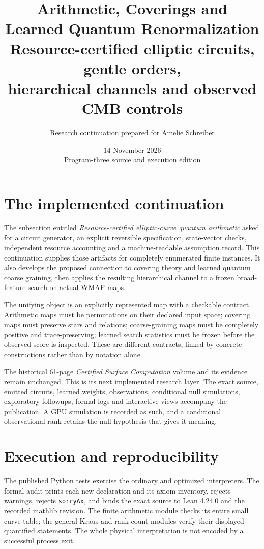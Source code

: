 \documentclass[11pt,oneside,openany]{book}
\title{\textbf{Arithmetic, Coverings and\\Learned Quantum Renormalization}\\[1em]\Large Resource-certified elliptic circuits, gentle orders,\\hierarchical channels and observed CMB controls}
\author{Research continuation prepared for Amelie Schreiber}
\date{14 November 2026\\\small Program-three source and execution edition}
\begin{document}
\frontmatter\maketitle
\chapter*{The implemented continuation}
The subsection entitled \emph{Resource-certified elliptic-curve quantum arithmetic} asked for a circuit generator, an explicit reversible specification, state-vector checks, independent resource accounting and a machine-readable assumption record. This continuation supplies those artifacts for completely enumerated finite instances. It also develops the proposed connection to covering theory and learned quantum coarse graining, then applies the resulting hierarchical channel to a frozen broad-feature search on actual WMAP maps.

The unifying object is an explicitly represented map with a checkable contract. Arithmetic maps must be permutations on their declared input space; covering maps must preserve stars and relations; coarse-graining maps must be completely positive and trace-preserving; learned search statistics must be frozen before the observed score is inspected. These are different contracts, linked by concrete constructions rather than by notation alone.

The historical 61-page \emph{Certified Surface Computation} volume and its evidence remain unchanged. This is its next implemented research layer. The exact source, emitted circuits, learned weights, observations, conditional null simulations, exploratory followups, formal logs and interactive views accompany the publication. A GPU simulation is recorded as such, and a conditional observational rank retains the null hypothesis that gives it meaning.
\tableofcontents\mainmatter



\begin{center}\small\end{center}


\chapter{Execution and reproducibility}


The published Python tests exercise the ordinary and optimized interpreters. The formal audit prints each new declaration and its axiom inventory, rejects warnings, rejects \texttt{sorryAx}, and binds the exact source to Lean 4.24.0 and the recorded mathlib revision. The finite arithmetic module checks its entire small curve table; the general Kraus and rank-count modules verify their displayed quantified statements. The whole physical interpretation is not encoded by a successful process exit.
\end{document}
